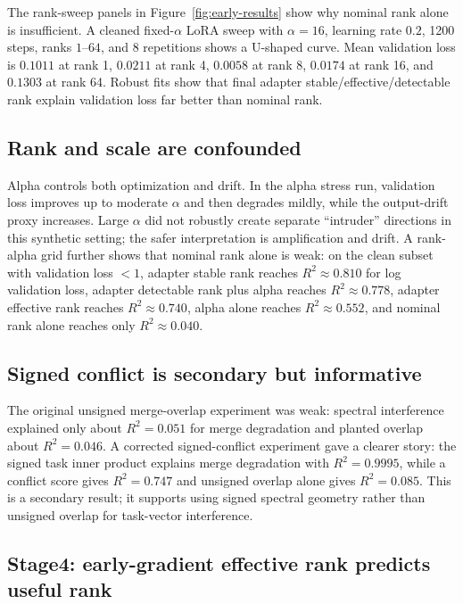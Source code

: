 \documentclass[10pt,twocolumn]{article}
\theoremstyle{definition}
\begin{document}
The rank-sweep panels in Figure~\ref{fig:early-results} show why nominal rank alone is insufficient.  A cleaned fixed-$\alpha$ LoRA sweep with $\alpha=16$, learning rate $0.2$, 1200 steps, ranks $1$--$64$, and 8 repetitions shows a U-shaped curve.  Mean validation loss is $0.1011$ at rank 1, $0.0211$ at rank 4, $0.0058$ at rank 8, $0.0174$ at rank 16, and $0.1303$ at rank 64.  Robust fits show that final adapter stable/effective/detectable rank explain validation loss far better than nominal rank.

\subsection{Rank and scale are confounded}

Alpha controls both optimization and drift.  In the alpha stress run, validation loss improves up to moderate $\alpha$ and then degrades mildly, while the output-drift proxy increases.  Large $\alpha$ did not robustly create separate ``intruder'' directions in this synthetic setting; the safer interpretation is amplification and drift.  A rank-alpha grid further shows that nominal rank alone is weak: on the clean subset with validation loss $<1$, adapter stable rank reaches $R^2\approx0.810$ for log validation loss, adapter detectable rank plus alpha reaches $R^2\approx0.778$, adapter effective rank reaches $R^2\approx0.740$, alpha alone reaches $R^2\approx0.552$, and nominal rank alone reaches only $R^2\approx0.040$.

\subsection{Signed conflict is secondary but informative}

The original unsigned merge-overlap experiment was weak: spectral interference explained only about $R^2=0.051$ for merge degradation and planted overlap about $R^2=0.046$.  A corrected signed-conflict experiment gave a clearer story: the signed task inner product explains merge degradation with $R^2=0.9995$, while a conflict score gives $R^2=0.747$ and unsigned overlap alone gives $R^2=0.085$.  This is a secondary result; it supports using signed spectral geometry rather than unsigned overlap for task-vector interference.

\subsection{Stage4: early-gradient effective rank predicts useful rank}
\end{document}
